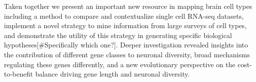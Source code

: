 Taken together we present an important new resource in mapping brain cell types including a method to compare and contextualize single cell RNA-seq datasets, implement a novel strategy to mine information from large surveys of cell types, and demonstrate the utility of this strategy in generating specific biological hypotheses[#Specifically which one?]. Deeper investigation revealed insights into the contribution of different gene classes to neuronal diversity, broad mechanisms regulating these genes differently, and a new evolutionary perspective on the cost-to-benefit balance driving gene length and neuronal diversity.









